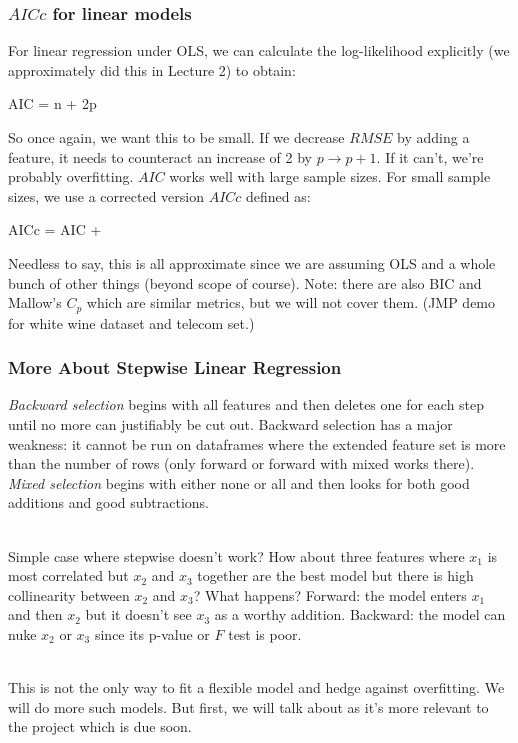 \documentclass[handout]{beamer}
\begin{document}
\begin{frame}\frametitle{$AICc$ for linear models}
\small
For linear regression under OLS, we can calculate the log-likelihood explicitly (we approximately did this in Lecture 2) to obtain:

\beqn
AIC = n + 2p
\eeqn

\pause So once again, we want this to be small. If we decrease $RMSE$ by adding a feature, it needs to counteract an increase of 2 by $p \rightarrow p+1$. If it can't, we're probably overfitting. \pause $AIC$ works well with large sample sizes. For small sample sizes, we use a corrected version $AICc$ defined as:

\beqn
AICc = AIC + 
\eeqn

Needless to say, this is all approximate since we are assuming OLS and a whole bunch of other things (beyond scope of course). \pause Note: there are also BIC and Mallow's $C_p$ which are similar metrics, but we will not cover them. \pause (JMP demo for white wine dataset and telecom set.)


	
\end{frame}

\begin{frame}\frametitle{More About Stepwise Linear Regression}

\small
\emph{Backward selection} begins with all features and then deletes one for each step until no more can justifiably be cut out. \pause Backward selection has a major weakness: it cannot be run on dataframes where the extended feature set is more than the number of rows (only forward or forward with mixed works there). \pause \emph{Mixed selection} begins with either none or all and then looks for both good additions and good subtractions. \\~\\ \pause

Simple case where stepwise doesn't work? \pause How about three features where $x_1$ is most correlated but $x_2$ and $x_3$ together are the best model but there is high collinearity between $x_2$ and $x_3$? What happens? \pause Forward: the model enters $x_1$ and then $x_2$ but it doesn't see $x_3$ as a worthy addition. Backward: the model can nuke $x_2$ or $x_3$ since its p-value or $F$ test is poor. \\~\\ \pause
	
This is not the only way to fit a flexible model and hedge against overfitting. We will do more such models. But first, we will talk about  as it's more relevant to the project which is due soon.
\end{frame}
\end{document}
